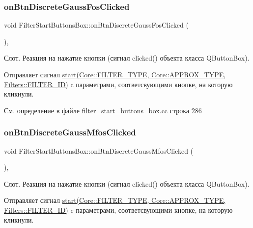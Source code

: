 \subsubsection{\texorpdfstring{on\+Btn\+Discrete\+Gauss\+Fos\+Clicked}{onBtnDiscreteGaussFosClicked}}
{\footnotesize\ttfamily void Filter\+Start\+Buttons\+Box\+::on\+Btn\+Discrete\+Gauss\+Fos\+Clicked (\begin{DoxyParamCaption}{ }\end{DoxyParamCaption})\hspace{0.3cm}{\ttfamily [private]}, {\ttfamily [slot]}}

Слот. Реакция на нажатие кнопки (сигнал clicked() объекта класса Q\+Button\+Box).

Отправляет сигнал \hyperlink{class_filter_start_buttons_box_ac6e2a6555f1d388391f188f834b8e753}{start(\+Core\+::\+F\+I\+L\+T\+E\+R\+\_\+\+T\+Y\+P\+E, Core\+::\+A\+P\+P\+R\+O\+X\+\_\+\+T\+Y\+P\+E, Filters\+::\+F\+I\+L\+T\+E\+R\+\_\+\+I\+D)} c параметрами, соответсвующими кнопке, на которую кликнули. 

См. определение в файле filter\+\_\+start\+\_\+buttons\+\_\+box.\+cc строка 286

\hypertarget{class_filter_start_buttons_box_adbba7359eb2dd93c889c62665f5f70c2}{}\label{class_filter_start_buttons_box_adbba7359eb2dd93c889c62665f5f70c2} 
\subsubsection{\texorpdfstring{on\+Btn\+Discrete\+Gauss\+Mfos\+Clicked}{onBtnDiscreteGaussMfosClicked}}
{\footnotesize\ttfamily void Filter\+Start\+Buttons\+Box\+::on\+Btn\+Discrete\+Gauss\+Mfos\+Clicked (\begin{DoxyParamCaption}{ }\end{DoxyParamCaption})\hspace{0.3cm}{\ttfamily [private]}, {\ttfamily [slot]}}

Слот. Реакция на нажатие кнопки (сигнал clicked() объекта класса Q\+Button\+Box).

Отправляет сигнал \hyperlink{class_filter_start_buttons_box_ac6e2a6555f1d388391f188f834b8e753}{start(\+Core\+::\+F\+I\+L\+T\+E\+R\+\_\+\+T\+Y\+P\+E, Core\+::\+A\+P\+P\+R\+O\+X\+\_\+\+T\+Y\+P\+E, Filters\+::\+F\+I\+L\+T\+E\+R\+\_\+\+I\+D)} c параметрами, соответсвующими кнопке, на которую кликнули. 

